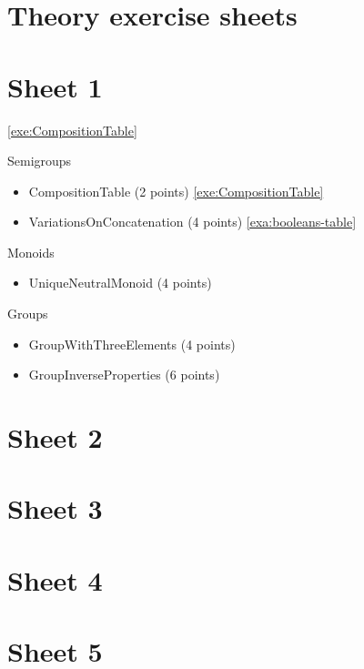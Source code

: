 
\section{Theory exercise sheets}


\section{Sheet 1}

 \cref{exe:CompositionTable}
   
Semigroups
\begin{itemize}
\item CompositionTable (2 points) \cref{exe:CompositionTable} 
\item VariationsOnConcatenation (4 points) \cref{exa:booleans-table}
\end{itemize}

Monoids
\begin{itemize}
\item UniqueNeutralMonoid (4 points)

\end{itemize}

Groups
\begin{itemize}
\item GroupWithThreeElements (4 points)
\item GroupInverseProperties (6 points)
\end{itemize}




\section{Sheet 2}

\section{Sheet 3}


\section{Sheet 4}

\section{Sheet 5}